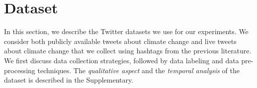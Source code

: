 \documentclass[letterpaper]{article} %
\begin{document}
\section{Dataset}\label{dataset}
In this section, we describe the Twitter datasets we use for our experiments. We consider both publicly available tweets about climate change and live tweets about climate change that we collect using hashtags from the previous literature. We first discuss data collection strategies, followed by data labeling and data pre-processing techniques. The \textit{qualitative aspect} and the \textit{temporal analysis} of the dataset is described in the Supplementary.

\end{document}
